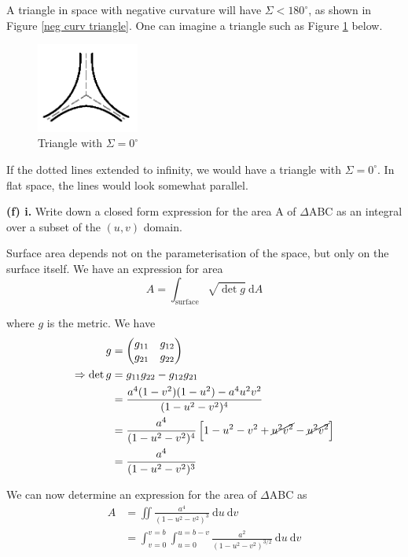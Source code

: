 \documentclass[a4paper]{article} %
\newcommand{\pmx}[1]{\begin{pmatrix}#1\end{pmatrix}}
\begin{document}
A triangle in space with negative curvature will have $\Sigma<180^{\circ}$, as shown in Figure \ref{neg curv triangle}. One can imagine a triangle such as Figure \ref{no angle triangle} below.

\begin{figure}[h]
\centering
\includegraphics[width=0.3\textwidth]{images/zeroAngle.png}
\caption{Triangle with $\Sigma=0^{\circ}$}
\label{no angle triangle}
\end{figure}

If the dotted lines extended to infinity, we would have a triangle with $\Sigma=0^{\circ}$. In flat space, the lines would look somewhat parallel.

\pagebreak  %

\begin{framed}
\textbf{(f) i.} Write down a closed form expression for the area A of $\Delta$ABC as an integral over a subset of the $(u,v)$ domain.
\end{framed}

Surface area depends not on the parameterisation of the space, but only on the surface itself. We have an expression for area
\begin{equation}
A=\int_{\text{surface}}\sqrt{\det g}~\text{d}A
\end{equation}

where $g$ is the metric. We have
\begin{align}
g&=\pmx{g_{11}&g_{12}\\g_{21}&g_{22}}\\
\Rightarrow \det g&=g_{11}g_{22}-g_{12}g_{21}\\
&=\frac{a^4(1-v^2)(1-u^2)-a^4 u^2 v^2}{(1-u^2-v^2)^4}\\
&=\frac{a^4}{(1-u^2-v^2)^4}\left[1-u^2-v^2+\cancel{u^2 v^2}-\cancel{u^2 v^2}\right]\\
&=\frac{a^4}{(1-u^2-v^2)^3}
\end{align}

We can now determine an expression for the area of $\Delta$ABC as
\begin{align}
A&=\iint \frac{a^4}{(1-u^2-v^2)^3}~\text{d}u~\text{d}v\\
&=\int_{v=0}^{v=b}\int_{u=0}^{u=b-v}\frac{a^2}{(1-u^2-v^2)^{3/2}}~\text{d}u~\text{d}v\label{abc area uv}
\end{align}
\end{document}
